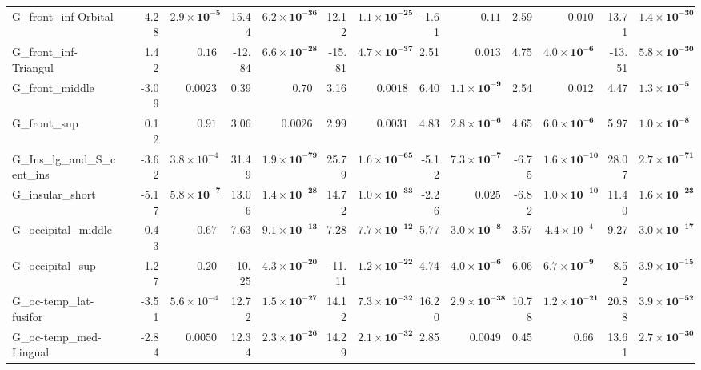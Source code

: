 {\begin{longtable}{llrrrrrrrrrrrr}
G\_front\_inf-Orbital &  & 4.28 & $\mathbf{2.9{\times}10^{-5}}$ & 15.44 & $\mathbf{6.2{\times}10^{-36}}$ & 12.12 & $\mathbf{1.1{\times}10^{-25}}$ & -1.61 & $0.11$ & 2.59 & $0.010$ & 13.71 & $\mathbf{1.4{\times}10^{-30}}$ \\
G\_front\_inf-Triangul &  & 1.42 & $0.16$ & -12.84 & $\mathbf{6.6{\times}10^{-28}}$ & -15.81 & $\mathbf{4.7{\times}10^{-37}}$ & 2.51 & $0.013$ & 4.75 & $\mathbf{4.0{\times}10^{-6}}$ & -13.51 & $\mathbf{5.8{\times}10^{-30}}$ \\
G\_front\_middle &  & -3.09 & $0.0023$ & 0.39 & $0.70$ & 3.16 & $0.0018$ & 6.40 & $\mathbf{1.1{\times}10^{-9}}$ & 2.54 & $0.012$ & 4.47 & $\mathbf{1.3{\times}10^{-5}}$ \\
G\_front\_sup &  & 0.12 & $0.91$ & 3.06 & $0.0026$ & 2.99 & $0.0031$ & 4.83 & $\mathbf{2.8{\times}10^{-6}}$ & 4.65 & $\mathbf{6.0{\times}10^{-6}}$ & 5.97 & $\mathbf{1.0{\times}10^{-8}}$ \\
G\_Ins\_lg\_and\_S\_cent\_ins &  & -3.62 & $3.8{\times}10^{-4}$ & 31.49 & $\mathbf{1.9{\times}10^{-79}}$ & 25.79 & $\mathbf{1.6{\times}10^{-65}}$ & -5.12 & $\mathbf{7.3{\times}10^{-7}}$ & -6.75 & $\mathbf{1.6{\times}10^{-10}}$ & 28.07 & $\mathbf{2.7{\times}10^{-71}}$ \\
G\_insular\_short &  & -5.17 & $\mathbf{5.8{\times}10^{-7}}$ & 13.06 & $\mathbf{1.4{\times}10^{-28}}$ & 14.72 & $\mathbf{1.0{\times}10^{-33}}$ & -2.26 & $0.025$ & -6.82 & $\mathbf{1.0{\times}10^{-10}}$ & 11.40 & $\mathbf{1.6{\times}10^{-23}}$ \\
G\_occipital\_middle &  & -0.43 & $0.67$ & 7.63 & $\mathbf{9.1{\times}10^{-13}}$ & 7.28 & $\mathbf{7.7{\times}10^{-12}}$ & 5.77 & $\mathbf{3.0{\times}10^{-8}}$ & 3.57 & $4.4{\times}10^{-4}$ & 9.27 & $\mathbf{3.0{\times}10^{-17}}$ \\
G\_occipital\_sup &  & 1.27 & $0.20$ & -10.25 & $\mathbf{4.3{\times}10^{-20}}$ & -11.11 & $\mathbf{1.2{\times}10^{-22}}$ & 4.74 & $\mathbf{4.0{\times}10^{-6}}$ & 6.06 & $\mathbf{6.7{\times}10^{-9}}$ & -8.52 & $\mathbf{3.9{\times}10^{-15}}$ \\
G\_oc-temp\_lat-fusifor &  & -3.51 & $5.6{\times}10^{-4}$ & 12.72 & $\mathbf{1.5{\times}10^{-27}}$ & 14.12 & $\mathbf{7.3{\times}10^{-32}}$ & 16.20 & $\mathbf{2.9{\times}10^{-38}}$ & 10.78 & $\mathbf{1.2{\times}10^{-21}}$ & 20.88 & $\mathbf{3.9{\times}10^{-52}}$ \\
G\_oc-temp\_med-Lingual &  & -2.84 & $0.0050$ & 12.34 & $\mathbf{2.3{\times}10^{-26}}$ & 14.29 & $\mathbf{2.1{\times}10^{-32}}$ & 2.85 & $0.0049$ & 0.45 & $0.66$ & 13.61 & $\mathbf{2.7{\times}10^{-30}}$ \\

\end{longtable}}
